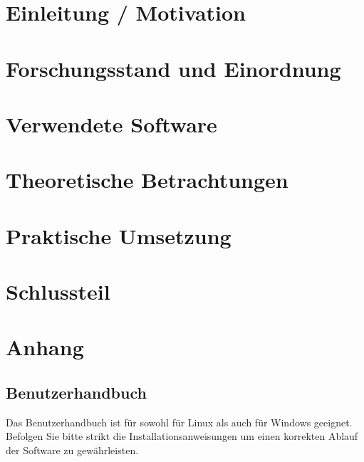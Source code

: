 \documentclass[12pt]{scrreprt}
\theoremstyle{remark}
\begin{document}
\singlespacing
\tableofcontents

\onehalfspacing

\chapter{Einleitung / Motivation}
\label{chap:introduction}


\chapter{Forschungsstand und Einordnung}
\label{chap:forschung}


\chapter{Verwendete Software}
\label{chap:software}


\chapter{Theoretische Betrachtungen}
\label{chap:theorie}



\chapter{Praktische Umsetzung}
\label{chap:praxis}


\chapter{Schlussteil}
\label{chap:ausblick}


%
\printbibliography

\chapter{Anhang}
\section{Benutzerhandbuch} 

Das Benutzerhandbuch ist für sowohl für Linux als auch für Windows geeignet. Befolgen Sie bitte strikt die Installationsanweisungen um einen korrekten Ablauf der Software zu gewährleisten.\\
\end{document}

